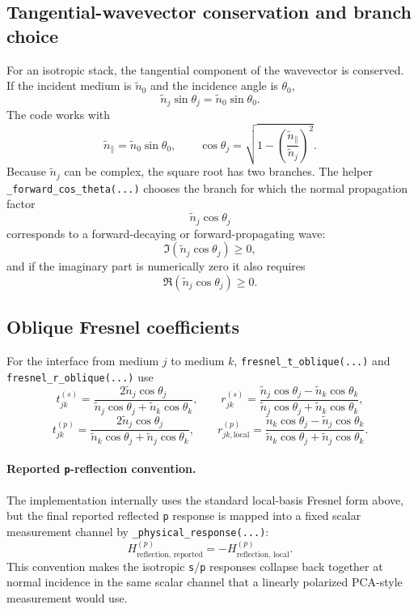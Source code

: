 \documentclass[11pt]{article}
\begin{document}
\subsection{Tangential-wavevector conservation and branch choice}
For an isotropic stack, the tangential component of the wavevector is conserved. If the
incident medium is $\tilde{n}_0$ and the incidence angle is $\theta_0$,
\[
\tilde{n}_j \sin\theta_j = \tilde{n}_0 \sin\theta_0.
\]
The code works with
\[
\tilde{n}_{\parallel} = \tilde{n}_0 \sin\theta_0,
\qquad
\cos\theta_j
=
\sqrt{1-\left(\frac{\tilde{n}_{\parallel}}{\tilde{n}_j}\right)^2}.
\]
Because $\tilde{n}_j$ can be complex, the square root has two branches. The helper
\texttt{\_forward\_cos\_theta(...)} chooses the branch for which the normal propagation factor
\[
\tilde{n}_j \cos\theta_j
\]
corresponds to a forward-decaying or forward-propagating wave:
\[
\Im\!\left(\tilde{n}_j \cos\theta_j\right) \ge 0,
\]
and if the imaginary part is numerically zero it also requires
\[
\Re\!\left(\tilde{n}_j \cos\theta_j\right) \ge 0.
\]

\subsection{Oblique Fresnel coefficients}
For the interface from medium $j$ to medium $k$, \texttt{fresnel\_t\_oblique(...)} and
\texttt{fresnel\_r\_oblique(...)} use
\[
t^{(s)}_{jk}
=
\frac{2 \tilde{n}_j \cos\theta_j}
{\tilde{n}_j \cos\theta_j + \tilde{n}_k \cos\theta_k},
\qquad
r^{(s)}_{jk}
=
\frac{\tilde{n}_j \cos\theta_j - \tilde{n}_k \cos\theta_k}
{\tilde{n}_j \cos\theta_j + \tilde{n}_k \cos\theta_k},
\]
\[
t^{(p)}_{jk}
=
\frac{2 \tilde{n}_j \cos\theta_j}
{\tilde{n}_k \cos\theta_j + \tilde{n}_j \cos\theta_k},
\qquad
r^{(p)}_{jk,\text{local}}
=
\frac{\tilde{n}_k \cos\theta_j - \tilde{n}_j \cos\theta_k}
{\tilde{n}_k \cos\theta_j + \tilde{n}_j \cos\theta_k}.
\]

\paragraph{Reported \texttt{p}-reflection convention.}
The implementation internally uses the standard local-basis Fresnel form above, but the final
reported reflected \texttt{p} response is mapped into a fixed scalar measurement channel by
\texttt{\_physical\_response(...)}:
\[
H^{(p)}_{\text{reflection, reported}}
=
-H^{(p)}_{\text{reflection, local}}.
\]
This convention makes the isotropic \texttt{s}/\texttt{p} responses collapse back together at
normal incidence in the same scalar channel that a linearly polarized PCA-style measurement
would use.
\end{document}
